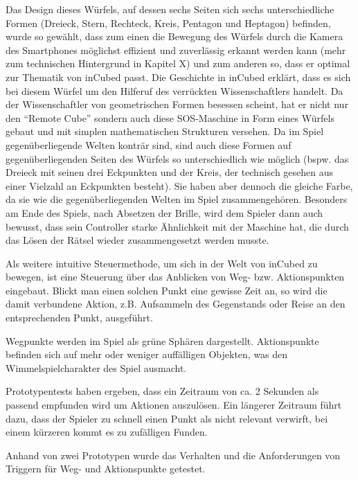 Das Design dieses Würfels, auf dessen sechs Seiten sich sechs unterschiedliche Formen (Dreieck, Stern, Rechteck, Kreis, Pentagon und Heptagon) befinden, wurde so gewählt, dass zum einen die Bewegung des Würfels durch die Kamera des Smartphones möglichst effizient und zuverlässig erkannt werden kann (mehr zum technischen Hintergrund in Kapitel X) und zum anderen so, dass er optimal zur Thematik von inCubed passt. Die Geschichte in inCubed erklärt, dass es sich bei diesem Würfel um den Hilferuf des verrückten Wissenschaftlers handelt. Da der Wissenschaftler von geometrischen Formen besessen scheint, hat er nicht nur den \enquote{Remote Cube} sondern auch diese SOS-Maschine in Form eines Würfels gebaut und mit simplen mathematischen Strukturen versehen. Da im Spiel gegenüberliegende Welten konträr sind, sind auch diese Formen auf gegenüberliegenden Seiten des Würfels so unterschiedlich wie möglich (bspw. das Dreieck mit seinen drei Eckpunkten und der Kreis, der technisch gesehen aus einer Vielzahl an Eckpunkten besteht). Sie haben aber dennoch die gleiche Farbe, da sie wie die gegenüberliegenden Welten im Spiel zusammengehören. Besonders am Ende des Spiels, nach Absetzen der Brille, wird dem Spieler dann auch bewusst, dass sein Controller starke Ähnlichkeit mit der Maschine hat, die durch das Lösen der Rätsel wieder zusammengesetzt werden musste.


Als weitere intuitive Steuermethode, um sich in der Welt von inCubed zu bewegen, ist eine Steuerung über das Anblicken von Weg- bzw. Aktionspunkten eingebaut. Blickt man einen solchen Punkt eine gewisse Zeit an, so wird die damit verbundene Aktion, z.B. Aufsammeln des Gegenstands oder Reise an den entsprechenden Punkt, ausgeführt.

Wegpunkte werden im Spiel als grüne Sphären dargestellt. Aktionspunkte befinden sich auf mehr oder weniger auffälligen Objekten, was den Wimmelspielcharakter des Spiel ausmacht.

Prototypentests haben ergeben, dass ein Zeitraum von ca. 2 Sekunden als passend empfunden wird um Aktionen auszulösen. Ein längerer Zeitraum führt dazu, dass der Spieler zu schnell einen Punkt als nicht relevant verwirft, bei einem kürzeren kommt es zu zufälligen Funden.


Anhand von zwei Prototypen wurde das Verhalten und die Anforderungen von Triggern für Weg- und Aktionspunkte getestet.

